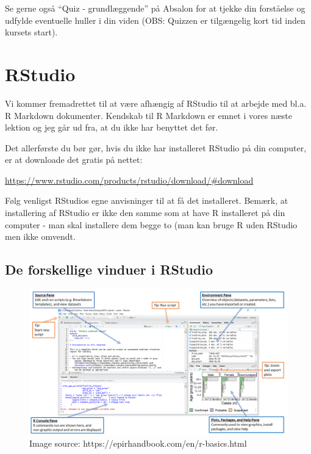\documentclass[
]{book}
\begin{document}
Se gerne også ``Quiz - grundlæggende'' på Absalon for at tjekke din forståelse og udfylde eventuelle huller i din viden (OBS: Quizzen er tilgængelig kort tid inden kursets start).

\section{RStudio}\label{rstudio}

Vi kommer fremadrettet til at være afhængig af RStudio til at arbejde med bl.a. R Markdown dokumenter. Kendskab til R Markdown er emnet i vores næste lektion og jeg går ud fra, at du ikke har benyttet det før.

Det allerførste du bør gør, hvis du ikke har installeret RStudio på din computer, er at downloade det gratis på nettet:

\url{https://www.rstudio.com/products/rstudio/download/\#download}

Følg venligst RStudios egne anvisninger til at få det installeret. Bemærk, at installering af RStudio er ikke den samme som at have R installeret på din computer - man skal installere dem begge to (man kan bruge R uden RStudio men ikke omvendt.

\subsection{De forskellige vinduer i RStudio}\label{de-forskellige-vinduer-i-rstudio}

\begin{figure}

{\centering \includegraphics[width=0.9\linewidth,height=0.9\textheight]{plots/RStudio_overview} 

}

\caption{Image source: https://epirhandbook.com/en/r-basics.html}\label{fig:unnamed-chunk-2}
\end{figure}
\end{document}
